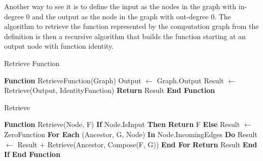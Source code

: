 \documentclass[11pt,a4paper]{article}
\begin{document}
Another way to see it is to define the input as the nodes in the graph with in-degree 0 and the output as the node in the graph with out-degree 0. The algorithm to retrieve the function represented by the computation graph from the definition is then a recursive algorithm that builds the function starting at an output node with function identity.
\\

\begin{algorithm}
\caption{Retrieve Function}
\label{alg:retrieve_function}
\begin{algorithmic}[1]
\STATE \textbf{Function} RetrieveFunction(Graph)
\STATE \hspace{1em} Output $\leftarrow$ Graph.Output
\STATE \hspace{1em} Result $\leftarrow$ Retrieve(Output, IdentityFunction)
\STATE \hspace{1em} \textbf{Return} Result
\STATE \textbf{End Function}
\end{algorithmic}
\end{algorithm}

\begin{algorithm}
\caption{Retrieve}
\label{alg:retrieve}
\begin{algorithmic}[1]
\STATE \textbf{Function} Retrieve(Node, F)
\STATE \hspace{1em} \textbf{If} Node.IsInput \textbf{Then}
\STATE \hspace{2em} \textbf{Return} F
\STATE \hspace{1em} \textbf{Else}
\STATE \hspace{2em} Result $\leftarrow$ ZeroFunction
\STATE \hspace{2em} \textbf{For Each} (Ancestor, G, Node) \textbf{In} Node.IncomingEdges \textbf{Do}
\STATE \hspace{3em} Result $\leftarrow$ Result + Retrieve(Ancestor, Compose(F, G))
\STATE \hspace{2em} \textbf{End For}
\STATE \hspace{2em} \textbf{Return} Result
\STATE \hspace{1em} \textbf{End If}
\STATE \textbf{End Function}
\end{algorithmic}
\end{algorithm}
\end{document}
